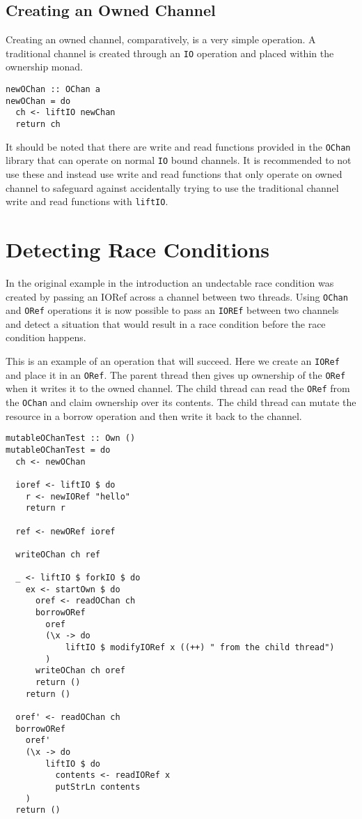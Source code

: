 \documentclass[onehalf,11pt]{beavtex}
\begin{document}

\subsection{Creating an Owned Channel}

Creating an owned channel, comparatively, is a very simple operation.
A traditional channel is created through an \texttt{IO} operation and placed
within the ownership monad.

\begin{verbatim}
newOChan :: OChan a
newOChan = do
  ch <- liftIO newChan
  return ch
\end{verbatim}

It should be noted that there are write and read functions provided
in the \texttt{OChan} library that can operate on normal \texttt{IO} bound
channels.  It is recommended to not use these and instead use write and read
functions that only operate on owned channel to safeguard against
accidentally trying to use the traditional channel write and read functions
with \texttt{liftIO}.

\section{Detecting Race Conditions}

In the original example in the introduction an undectable race condition was
created by passing an IORef across a channel between two threads.
Using \texttt{OChan} and \texttt{ORef} operations it is now possible
to pass an \texttt{IOREf} between two channels and detect a situation
that would result in a race condition before the race condition happens.

This is an example of an operation that will succeed. Here we create an
\texttt{IORef} and place it in an \texttt{ORef}. The parent thread
then gives up ownership of the \texttt{ORef} when it writes it to the
owned channel. The child thread can read the \texttt{ORef} from the
\texttt{OChan} and claim ownership over its contents. The child thread
can mutate the resource in a borrow operation and then write it back to
the channel. 

\begin{verbatim}
mutableOChanTest :: Own ()
mutableOChanTest = do
  ch <- newOChan

  ioref <- liftIO $ do
    r <- newIORef "hello"
    return r

  ref <- newORef ioref

  writeOChan ch ref

  _ <- liftIO $ forkIO $ do
    ex <- startOwn $ do
      oref <- readOChan ch
      borrowORef
        oref
        (\x -> do
            liftIO $ modifyIORef x ((++) " from the child thread")
        )
      writeOChan ch oref
      return ()
    return ()

  oref' <- readOChan ch
  borrowORef
    oref'
    (\x -> do
        liftIO $ do
          contents <- readIORef x
          putStrLn contents
    )
  return ()
\end{verbatim}
\end{document}
